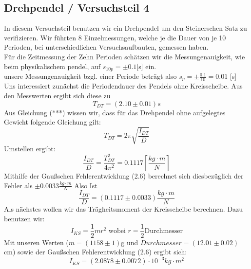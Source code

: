 \documentclass[11pt,a4paper]{article}
\begin{document}
	\subsection{Drehpendel / Versuchsteil 4}
	In diesem Versuchsteil benutzen wir ein Drehpendel um den Steinerschen Satz zu verifizieren.
	Wir führten 8 Einzelmessungen, welche je die  Dauer von je 10 Perioden, bei unterschiedlichen Versuchsaufbauten, gemessen haben.\\
	Für die Zeitmessung der Zehn Perioden schätzen wir die Messungenauigkeit, wie beim physikalischem pendel, auf $s_{10p}=\pm 0.1$[s] ein.\\
	unsere Messungenauigkeit bzgl. einer Periode beträgt also $s_p=\pm \frac{0.1}{10} =0.01$ [s]
	\\
	Uns interessiert zunächst die Periodendauer des Pendels ohne Kreisscheibe. Aus den Messwerten
	ergibt sich diese zu $$T_{DT}=(2.10\pm 0.01)s$$
	Aus Gleichung (***) wissen wir, dass für das Drehpendel ohne aufgelegtes Gewicht folgende Gleichung gilt:
	\begin{equation}
	T_{DT}=2 \pi \sqrt{\frac{I_{DT}}{D}}
	\end{equation}
	Umstellen ergibt:
	\begin{equation}
	\frac{I_{DT}}{D} = \frac{T_{DT}^2}{4 \pi^2}=0.1117[\frac{kg\cdot m}{N}]
	\end{equation}
	Mithilfe der Gaußschen Fehlerentwicklung (2.6) berechnet sich diesbezüglich der Fehler als $\pm 0.0033
	\frac{kg \cdot m}{N}$
	Also Ist $$\frac{I_{DT}}{D} =(0.1117 \pm 0.0033)\frac{kg\cdot m}{N}$$
	Als nächstes wollen wir das Trägheitsmoment der Kreisscheibe berechnen. Dazu benutzen wir:
	\begin{equation}
	I_{KS}=\frac{1}{2}m r^2 \text{  wobei  } r=\frac{1}{2} \text{Durchmesser}
	\end{equation}
	Mit unseren Werten ($m=(1158\pm 1)$g und $Durchmesser=(12.01 \pm 0.02)$cm) sowie der Gaußschen
	Fehlerentwicklung (2.6) ergibt sich:
	\begin{equation}
	I_{KS}=(2.0878 \pm 0.0072)\cdot 10^{-3} kg \cdot m^2
	\end{equation}
\end{document}
